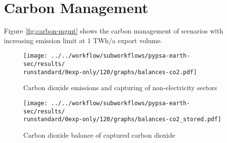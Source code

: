 \section{Carbon Management}
\label{subsec:carbon_mgmt}

Figure \ref{fig:carbon-mgmt} shows the carbon management of scenarios with increasing emission limit at 1 TWh/a export volume.


\begin{figure*}[h!]
    \centering
    \begin{subfigure}[b]{0.49\linewidth}
        \centering
        \texttt{[image: ../../workflow/subworkflows/pypsa-earth-sec/results/\\runstandard/0exp-only/120/graphs/balances-co2.pdf]}
        \caption{Carbon dioxide emissions and capturing of non-electricity sectors}
        \label{fig:carbon-atmo}
    \end{subfigure}
    \hfill
    \begin{subfigure}[b]{0.49\linewidth}
        \centering
        \texttt{[image: ../../workflow/subworkflows/pypsa-earth-sec/results/\\runstandard/0exp-only/120/graphs/balances-co2\_stored.pdf]}
        \caption{Carbon dioxide balance of captured carbon dioxide}
        \label{fig:carbon-store}
    \end{subfigure}
    \hfill
    \caption{Carbon dioxide \ref{fig:carbon-atmo} emissions and capturing as well as \ref{fig:carbon-store} management of captured carbon dioxide}
    \label{fig:carbon-mgmt}
\end{figure*}


\clearpage